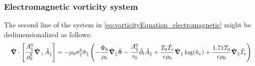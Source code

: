 \subsubsection{Electromagnetic vorticity system}
The second line of the system in \autoref{eq:vorticityEquation_electromagnetic} might be dedimensionalized as follows:
\begin{align}
&&\hat{\grad}\cdot\left[\frac{A_\parallel^0}{\rho_0^2}\hat{\grad}_\perp \hat{A}_\parallel\right]
&= -\mu_0\sigma_\parallel^0\hat{\sigma}_\parallel\left(
- \frac{\Phi_0}{\rho_0}\hat{\grad}_\parallel\hat{\Phi}
- \frac{A_\parallel^0}{\tau_0}\hat{\partial}_t\hat{A}_\parallel
+ \frac{T_0\hat{T}_e}{e\rho_0}\hat{\grad}_\parallel\log(\hat{n}_e) 
+ \frac{1.71T_0}{e\rho_0}\hat{\grad}_\parallel \hat{T}_e\right) \nonumber \\

\end{align}
